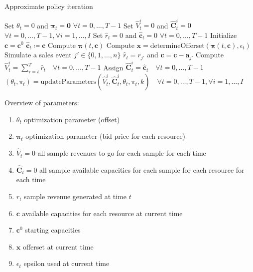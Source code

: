 \begin{algorithm}
	\caption{Approximate policy iteration}\label{alg-API}
	\begin{algorithmic}[1]
		\State Set $\theta_t = 0$ and $\mathbf{\pi}_t = \mathbf{0}$ $\forall t = 0, \dots, T-1$ \label{alg-API1}
		 \label{alg-API-Piter1}
		\State Set $\hat{V}_t^i = 0$ and $\mathbf{\hat{C}}_t^i = 0$ $\forall t = 0, \dots, T-1, \forall i = 1, \dots, I$\label{alg-API-Piter2}\label{alg-API3}
		\label{alg-API-Peval1}
		\State Set $\hat{r}_t = 0$ and $\mathbf{\hat{c}}_t = 0$ $\forall t = 0, \dots, T-1$\label{alg-API5}
		\State Initialize $\mathbf{c} = \mathbf{c}^0$\label{alg-API6}
		\State $\mathbf{\hat{c}}_t \coloneqq \mathbf{c}$\label{alg-API8}
		\State Compute $\mathbf{\pi}(t, \mathbf{c})$ \label{alg-API-calcPi}\label{alg-API9}
		\State Compute $\mathbf{x} = \text{determineOfferset}(\mathbf{\pi}(t, \mathbf{c}), \epsilon_t)$\label{alg-API10}
		\State Simulate a sales event $j' \in \{0, 1, \dots, n\}$\label{alg-API11}
		\State $\hat{r}_t = r_{j'}$ and $\mathbf{c} = \mathbf{c} - \mathbf{a}_{j'}$\label{alg-API13}
		\EndIf
		\EndFor
		\State Compute $\hat{V}_t^i = \sum_{\tau = t}^{T}\hat{r}_t \quad \forall t = 0, \dots, T-1$\label{alg-API14}
		\State Assign $\mathbf{\hat{C}}_t^i = \mathbf{\hat{c}}_t \quad \forall t = 0, \dots, T-1$\label{alg-API15} \label{alg-API-Peval2}
		\EndFor
		\State $\left(\theta_t, \pi_t \right) = \text{updateParameters}\left(\hat{V}_t^i, \mathbf{\hat{C}}_t^i, \theta_t, \pi_t, k\right) \quad \forall t = 0, \dots, T-1, \forall i = 1, \dots, I$ \label{alg-API-updateParam}\label{alg-API-Piter3}
		\EndFor
	\end{algorithmic}
\end{algorithm}


Overview of parameters:
\begin{enumerate}
	\item $\theta_t$	optimization parameter (offset)
	\item $\mathbf{\pi}_t$	optimization parameter (bid price for each resource)
	\item $\hat{V}_t = 0$	all sample revenues to go for each sample for each time
	\item $\mathbf{\hat{C}}_t = 0$	all sample available capacities for each sample for each resource for each time
	\item $r_t$	sample revenue generated at time $t$
	\item $\mathbf{c}$	available capacities for each resource at current time
	\item $\mathbf{c}^0$	starting capacities
	\item $\mathbf{x}$ offerset at current time
	\item $\epsilon_t$ epsilon used at current time
\end{enumerate}


